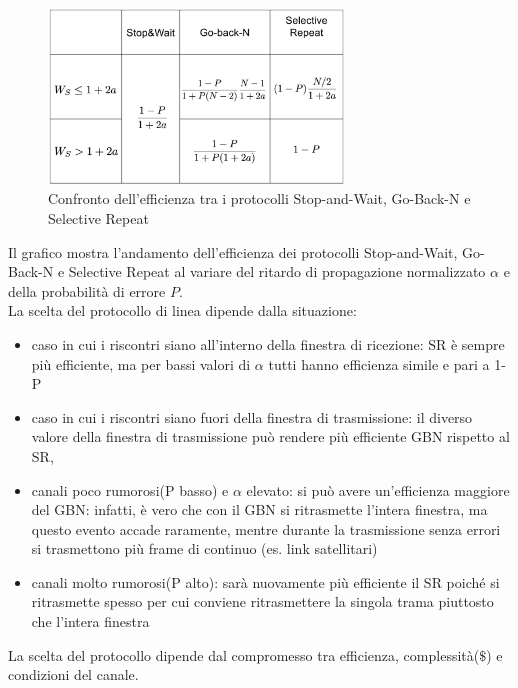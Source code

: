\begin{figure}[htbp]
    \centering
    \includegraphics[width=0.7\textwidth]{images/confrontoprotocolli.png}
    \caption{Confronto dell'efficienza tra i protocolli Stop-and-Wait, Go-Back-N e Selective Repeat}
\end{figure}

        Il grafico mostra l'andamento dell'efficienza dei protocolli Stop-and-Wait, Go-Back-N e Selective Repeat al variare del ritardo di propagazione normalizzato $\alpha$ e della probabilità di errore $P$.\\
        La scelta del protocollo di linea dipende dalla situazione:
        \begin{itemize}
            \item caso in cui i riscontri siano all'interno della finestra di ricezione: SR è sempre più efficiente, ma per bassi valori di $\alpha$ tutti hanno efficienza simile e pari a 1-P
            \item caso in cui i riscontri siano fuori della finestra di trasmissione: il diverso valore della finestra di trasmissione può
rendere più efficiente GBN rispetto al SR, 
            \item canali poco rumorosi(P basso) e $\alpha$ elevato: si
può avere un'efficienza maggiore del GBN: infatti, è vero che
con il GBN si ritrasmette l'intera finestra, ma questo evento
accade raramente, mentre durante la trasmissione senza errori
si trasmettono più frame di continuo (es. link satellitari) 
            \item canali molto rumorosi(P alto): sarà nuovamente più
efficiente il SR poiché si ritrasmette spesso per cui conviene
ritrasmettere la singola trama piuttosto che l'intera finestra
        \end{itemize}
        La scelta del protocollo dipende dal compromesso tra efficienza, complessità($\$$) e condizioni del canale.

        